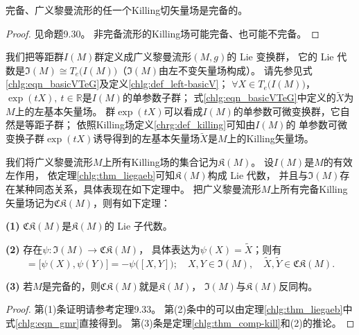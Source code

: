 \begin{theorem}\label{chlg:thm_comp-kill}
    完备、广义黎曼流形的任一个Killing切矢量场是完备的。
\end{theorem}
\begin{proof}
    见\parencite{oneill1983}命题9.30。
    非完备流形的Killing场可能完备、也可能不完备。
\end{proof}


我们把等距群$I(M)$群定义成广义黎曼流形$(M,g)$的 Lie 变换群，
它的 Lie 代数是$\mathfrak{I}(M)\cong T_e\bigl(I(M)\bigr)$（$\mathfrak{I}(M)$由左不变矢量场构成）。
请先参见式\eqref{chlg:eqn_basicVTeG}及定义\ref{chlg:def_left-basicV}；
$\forall X\in T_e\bigl(I(M)\bigr)$，$\exp(t X),\ t\in \mathbb{R}$是$I(M)$的单参数子群；
式\eqref{chlg:eqn_basicVTeG}中定义的$\widetilde{X}$为$M$上的左基本矢量场。
群$\exp(t X)$可以看成$I(M)$的单参数可微变换群，它自然是{\kaishu 等距}子群；
依照Killing场定义\ref{chrg:def_killing}可知由$I(M)$的
单参数可微变换子群$\exp(t X)$诱导得到的左基本矢量场$\widetilde{X}$是$M$上的Killing矢量场。



我们将广义黎曼流形$M$上所有Killing场的集合记为$\mathfrak{K}(M)$。
设$I(M)$是$M$的有效左作用，
依定理\ref{chlg:thm_liegaeb}可知$\mathfrak{K}(M)$构成 Lie 代数，
并且与$\mathfrak{I}(M)$存在某种同态关系，具体表现在如下定理中。
把广义黎曼流形$M$上所有{\kaishu 完备}Killing矢量场记为$\mathfrak{CK}(M)$，则有如下定理：
\begin{theorem}\label{chlg:thm_la-killing}
    {\bfseries (1)} $\mathfrak{CK}(M)$是$\mathfrak{K}(M)$的 Lie 子代数。
    
    {\bfseries (2)} 存在$\psi:\mathfrak{I}(M) \to \mathfrak{CK}(M)$，
    具体表达为$\psi(X)=\widetilde{X}$；则有
    \begin{equation*}
        [\widetilde{X},\widetilde{Y}]=\bigl[\psi(X),\psi(Y)\bigr]=-\psi\bigl([X,Y]\bigr);
        \quad X,Y\in\mathfrak{I}(M), \quad  
        \widetilde{X},\widetilde{Y} \in \mathfrak{CK}(M).
    \end{equation*}
    
    {\bfseries (3)} 若$M$是完备的，则$\mathfrak{CK}(M)$就是$\mathfrak{K}(M)$，
    $\mathfrak{I}(M)$与$\mathfrak{K}(M)$反同构。
\end{theorem}
\begin{proof}
    第(1)条证明请参考\parencite{oneill1983}定理9.33。
    第(2)条中的可以由定理\ref{chlg:thm_liegaeb}中式\eqref{chlg:eqn_gmr}直接得到。
    第(3)条是定理\ref{chlg:thm_comp-kill}和(2)的推论。
\end{proof}

